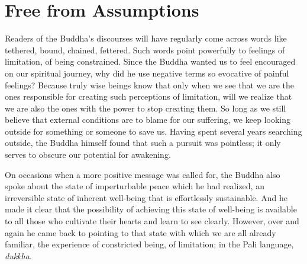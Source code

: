 

\chapter{Free from Assumptions}


Readers of the Buddha’s discourses will have regularly come across words
like tethered, bound, chained,
fettered\cite{dhp-276}.
Such words point powerfully to feelings of limitation, of being constrained. Since the
Buddha wanted us to feel encouraged on our spiritual journey, why did he
use negative terms so evocative of painful feelings? Because truly wise
beings know that only when we see that we are the ones responsible for
creating such perceptions of limitation, will we realize that we are
also the ones with the power to stop creating them. So long as we still
believe that external conditions are to blame for our suffering, we keep
looking outside for something or someone to save us. Having spent
several years searching outside, the Buddha himself found that such a
pursuit was pointless; it only serves to obscure our potential for
awakening.

On occasions when a more positive message was called for, the Buddha
also spoke about the state of imperturbable peace which he had realized,
an irreversible state of inherent well-being that is effortlessly
sustainable. And he made it clear that the possibility of achieving this
state of well-being is available to all those who cultivate their hearts
and learn to see clearly. However, over and again he came back to
pointing to that state with which we are all already familiar, the
experience of constricted being, of limitation; in the Pali language,
\emph{dukkha}.


